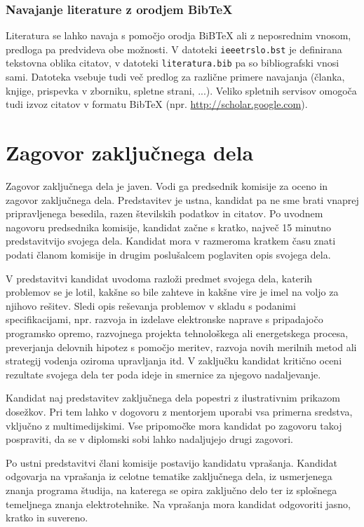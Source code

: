 \documentclass[a4paper,twoside,openright,12pt,slovene]{book}
\begin{document}
\subsection{Navajanje literature z orodjem BibTeX} \label{navajanje_bibtex}

Literatura se lahko navaja s pomočjo orodja BiBTeX ali z neposrednim vnosom, predloga pa predvideva obe možnosti. V datoteki \texttt{ieeetrslo.bst} je definirana tekstovna oblika citatov, v datoteki \texttt{literatura.bib} pa so bibliografski vnosi sami. Datoteka vsebuje tudi več predlog za različne primere navajanja (članka, knjige, prispevka v zborniku, spletne strani, ...). Veliko spletnih servisov omogoča tudi izvoz citatov v formatu BibTeX (npr. \url{http://scholar.google.com}).

\chapter{Zagovor zaključnega dela} \label{zagovor_dela}

Zagovor zaključnega dela je javen. Vodi ga predsednik komisije za oceno in zagovor zaključnega dela. Predstavitev je ustna, kandidat pa ne sme brati vnaprej pripravljenega besedila, razen številskih podatkov in citatov. Po uvodnem nagovoru predsednika komisije, kandidat začne s kratko, največ 15 minutno predstavitvijo svojega dela. Kandidat mora v razmeroma kratkem času znati podati članom komisije in drugim poslušalcem poglaviten opis svojega dela.

V predstavitvi kandidat uvodoma razloži predmet svojega dela, katerih problemov se je lotil, kakšne so bile zahteve in kakšne vire je imel na voljo za njihovo rešitev. Sledi opis reševanja problemov v skladu s podanimi specifikacijami, npr. razvoja in izdelave elektronske naprave s pripadajočo programsko opremo, razvojnega projekta tehnološkega ali energetskega procesa, preverjanja delovnih hipotez s pomočjo meritev, razvoja novih merilnih metod ali strategij vodenja oziroma upravljanja itd. V zaključku kandidat kritično oceni rezultate svojega dela ter poda ideje in smernice za njegovo nadaljevanje.

Kandidat naj predstavitev zaključnega dela popestri z ilustrativnim prikazom dosežkov. Pri tem lahko v dogovoru z mentorjem uporabi vsa primerna sredstva, vključno z multimedijskimi. Vse pripomočke mora kandidat po zagovoru takoj pospraviti, da se v diplomski sobi lahko nadaljujejo drugi zagovori.

Po ustni predstavitvi člani komisije postavijo kandidatu vprašanja. Kandidat odgovarja na vprašanja iz celotne tematike zaključnega dela, iz usmerjenega znanja programa študija, na katerega se opira zaključno delo ter iz splošnega temeljnega znanja elektrotehnike. Na vprašanja mora kandidat odgovoriti jasno, kratko in suvereno.
\end{document}
